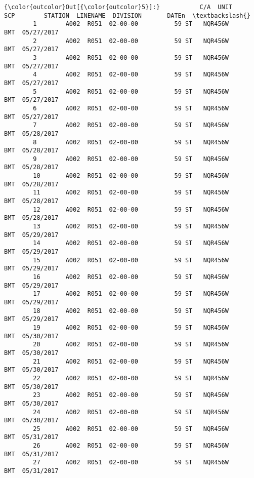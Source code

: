 \documentclass[11pt]{article}
\begin{document}
\begin{Verbatim}[commandchars=\\\{\}]
{\color{outcolor}Out[{\color{outcolor}5}]:}           C/A  UNIT       SCP        STATION  LINENAME  DIVISION       DATEn  \textbackslash{}
        1        A002  R051  02-00-00          59 ST   NQR456W       BMT  05/27/2017   
        2        A002  R051  02-00-00          59 ST   NQR456W       BMT  05/27/2017   
        3        A002  R051  02-00-00          59 ST   NQR456W       BMT  05/27/2017   
        4        A002  R051  02-00-00          59 ST   NQR456W       BMT  05/27/2017   
        5        A002  R051  02-00-00          59 ST   NQR456W       BMT  05/27/2017   
        6        A002  R051  02-00-00          59 ST   NQR456W       BMT  05/27/2017   
        7        A002  R051  02-00-00          59 ST   NQR456W       BMT  05/28/2017   
        8        A002  R051  02-00-00          59 ST   NQR456W       BMT  05/28/2017   
        9        A002  R051  02-00-00          59 ST   NQR456W       BMT  05/28/2017   
        10       A002  R051  02-00-00          59 ST   NQR456W       BMT  05/28/2017   
        11       A002  R051  02-00-00          59 ST   NQR456W       BMT  05/28/2017   
        12       A002  R051  02-00-00          59 ST   NQR456W       BMT  05/28/2017   
        13       A002  R051  02-00-00          59 ST   NQR456W       BMT  05/29/2017   
        14       A002  R051  02-00-00          59 ST   NQR456W       BMT  05/29/2017   
        15       A002  R051  02-00-00          59 ST   NQR456W       BMT  05/29/2017   
        16       A002  R051  02-00-00          59 ST   NQR456W       BMT  05/29/2017   
        17       A002  R051  02-00-00          59 ST   NQR456W       BMT  05/29/2017   
        18       A002  R051  02-00-00          59 ST   NQR456W       BMT  05/29/2017   
        19       A002  R051  02-00-00          59 ST   NQR456W       BMT  05/30/2017   
        20       A002  R051  02-00-00          59 ST   NQR456W       BMT  05/30/2017   
        21       A002  R051  02-00-00          59 ST   NQR456W       BMT  05/30/2017   
        22       A002  R051  02-00-00          59 ST   NQR456W       BMT  05/30/2017   
        23       A002  R051  02-00-00          59 ST   NQR456W       BMT  05/30/2017   
        24       A002  R051  02-00-00          59 ST   NQR456W       BMT  05/30/2017   
        25       A002  R051  02-00-00          59 ST   NQR456W       BMT  05/31/2017   
        26       A002  R051  02-00-00          59 ST   NQR456W       BMT  05/31/2017   
        27       A002  R051  02-00-00          59 ST   NQR456W       BMT  05/31/2017   

\end{Verbatim}
\end{document}
